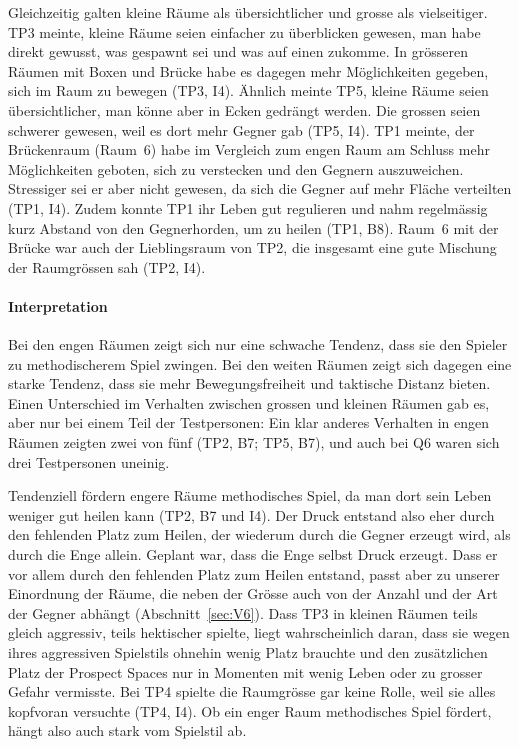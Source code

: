 \documentclass[../Main.tex]{subfiles}
\begin{document}
Gleichzeitig galten kleine Räume als übersichtlicher und grosse als vielseitiger. TP3 meinte, kleine Räume seien einfacher zu überblicken gewesen, man habe direkt gewusst, was gespawnt sei und was auf einen zukomme. In grösseren Räumen mit Boxen und Brücke habe es dagegen mehr Möglichkeiten gegeben, sich im Raum zu bewegen (TP3, I4). Ähnlich meinte TP5, kleine Räume seien übersichtlicher, man könne aber in Ecken gedrängt werden. Die grossen seien schwerer gewesen, weil es dort mehr Gegner gab (TP5, I4). TP1 meinte, der Brückenraum (Raum~6) habe im Vergleich zum engen Raum am Schluss mehr Möglichkeiten geboten, sich zu verstecken und den Gegnern auszuweichen. Stressiger sei er aber nicht gewesen, da sich die Gegner auf mehr Fläche verteilten (TP1, I4). Zudem konnte TP1 ihr Leben gut regulieren und nahm regelmässig kurz Abstand von den Gegnerhorden, um zu heilen (TP1, B8). Raum~6 mit der Brücke war auch der Lieblingsraum von TP2, die insgesamt eine gute Mischung der Raumgrössen sah (TP2, I4).

\paragraph{Interpretation}
Bei den engen Räumen zeigt sich nur eine schwache Tendenz, dass sie den Spieler zu methodischerem Spiel zwingen. Bei den weiten Räumen zeigt sich dagegen eine starke Tendenz, dass sie mehr Bewegungsfreiheit und taktische Distanz bieten. Einen Unterschied im Verhalten zwischen grossen und kleinen Räumen gab es, aber nur bei einem Teil der Testpersonen: Ein klar anderes Verhalten in engen Räumen zeigten zwei von fünf (TP2, B7; TP5, B7), und auch bei Q6 waren sich drei Testpersonen uneinig.

Tendenziell fördern engere Räume methodisches Spiel, da man dort sein Leben weniger gut heilen kann (TP2, B7 und I4). Der Druck entstand also eher durch den fehlenden Platz zum Heilen, der wiederum durch die Gegner erzeugt wird, als durch die Enge allein. Geplant war, dass die Enge selbst Druck erzeugt. Dass er vor allem durch den fehlenden Platz zum Heilen entstand, passt aber zu unserer Einordnung der Räume, die neben der Grösse auch von der Anzahl und der Art der Gegner abhängt (Abschnitt~\ref{sec:V6}). Dass TP3 in kleinen Räumen teils gleich aggressiv, teils hektischer spielte, liegt wahrscheinlich daran, dass sie wegen ihres aggressiven Spielstils ohnehin wenig Platz brauchte und den zusätzlichen Platz der Prospect Spaces nur in Momenten mit wenig Leben oder zu grosser Gefahr vermisste. Bei TP4 spielte die Raumgrösse gar keine Rolle, weil sie alles kopfvoran versuchte (TP4, I4). Ob ein enger Raum methodisches Spiel fördert, hängt also auch stark vom Spielstil ab.
\end{document}
